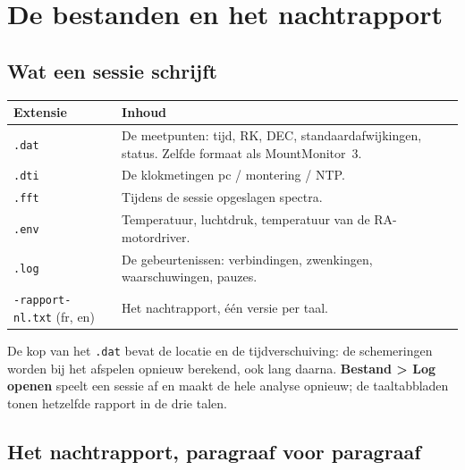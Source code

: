 \chapter{De bestanden en het nachtrapport}
\label{ch:files}

\section{Wat een sessie schrijft}

\begin{center}
\begin{tabularx}{\textwidth}{lX}
\toprule
\textbf{Extensie} & \textbf{Inhoud} \\
\midrule
\texttt{.dat} & De meetpunten: tijd, RK, DEC, standaardafwijkingen, status.
Zelfde formaat als MountMonitor~3. \\
\texttt{.dti} & De klokmetingen pc / montering / NTP. \\
\texttt{.fft} & Tijdens de sessie opgeslagen spectra. \\
\texttt{.env} & Temperatuur, luchtdruk, temperatuur van de RA-motordriver. \\
\texttt{.log} & De gebeurtenissen: verbindingen, zwenkingen, waarschuwingen,
pauzes. \\
\texttt{-rapport-nl.txt} (fr, en) & Het nachtrapport, één versie per taal. \\
\bottomrule
\end{tabularx}
\end{center}

De kop van het \texttt{.dat} bevat de locatie en de tijdverschuiving: de
schemeringen worden bij het afspelen opnieuw berekend, ook lang daarna.
\textbf{Bestand > Log openen} speelt een sessie af en maakt de hele analyse
opnieuw; de taaltabbladen tonen hetzelfde rapport in de drie talen.

\needspace{0.6\textheight}
\section{Het nachtrapport, paragraaf voor paragraaf}
\label{sec:report}


